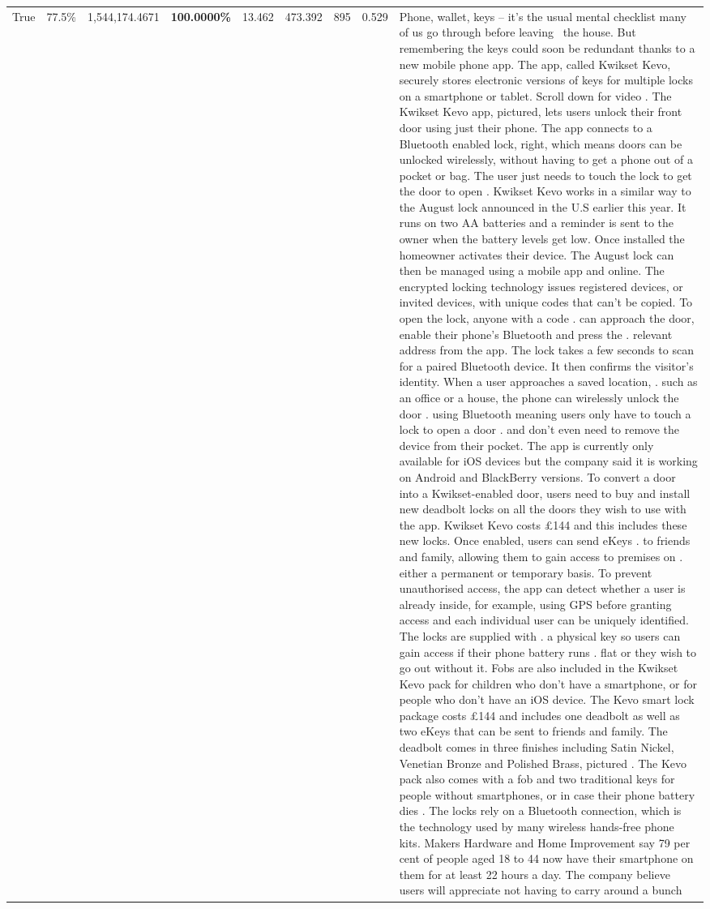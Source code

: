 \begin{table}[H]
\begin{tabular}{lllrlllll}
True & 77.5\% & 1,544,174.4671 & \bfseries \color{red} 100.0000\% & 13.462 & 473.392 & 895 & 0.529 & Phone, wallet, keys – it’s the usual mental checklist many of us go through before leaving  the house. But remembering the keys could soon be redundant thanks to a new mobile phone app. The app, called Kwikset Kevo, securely stores electronic versions of keys for multiple locks on a smartphone or tablet. Scroll down for video . The Kwikset Kevo app, pictured, lets users unlock their front door using just their phone. The app connects to a Bluetooth enabled lock, right, which means doors can be unlocked wirelessly, without having to get a phone out of a pocket or bag. The user just needs to touch the lock to get the door to open . Kwikset Kevo works in a similar way to the August lock announced in the U.S earlier this year. It runs on two AA batteries and a reminder is sent to the owner when the battery levels get low. Once installed the homeowner activates their device. The August lock can then be managed using a mobile app and online. The encrypted locking technology issues registered devices, or invited devices, with unique codes that can't be copied. To open the lock, anyone with a code . can approach the door, enable their phone's Bluetooth and press the . relevant address from the app. The lock takes a few seconds to scan for a paired Bluetooth device. It then confirms the visitor's identity. When a user approaches a saved location, . such as an office or a house, the phone can wirelessly unlock the door . using Bluetooth meaning users only have to touch a lock to open a door . and don't even need to remove the device from their pocket. The app is currently only available for iOS devices but the company said it is working on Android and BlackBerry versions. To convert a door into a Kwikset-enabled door, users need to buy and install new deadbolt locks on all the doors they wish to use with the app. Kwikset Kevo costs £144 and this includes these new locks. Once enabled, users can send eKeys . to friends and family, allowing them to gain access to premises on . either a permanent or temporary basis. To prevent unauthorised access, the app can detect whether a user is already inside, for example, using GPS before granting access and each individual user can be uniquely identified. The locks are supplied with . a physical key so users can gain access if their phone battery runs . flat or they wish to go out without it. Fobs are also included in the Kwikset Kevo pack for children who don't have a smartphone, or for people who don't have an iOS device. The Kevo smart lock package costs £144 and includes one deadbolt as well as two eKeys that can be sent to friends and family. The deadbolt comes in three finishes including Satin Nickel, Venetian Bronze and Polished Brass, pictured . The Kevo pack also comes with a fob and two traditional keys for people without smartphones, or in case their phone battery dies . The locks rely on a Bluetooth connection, which is the technology used by many wireless hands-free phone kits. Makers Hardware and Home Improvement say 79 per cent of people aged 18 to 44 now have their smartphone on them for at least 22 hours a day. The company believe users will appreciate not having to carry around a bunch 
\end{tabular}
\end{table}
